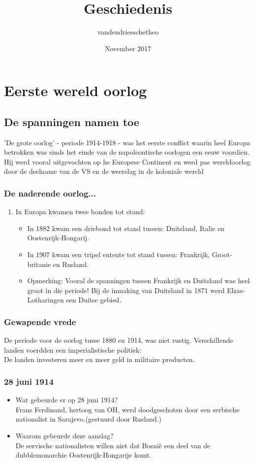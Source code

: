 \documentclass{article}
\title{Geschiedenis}
\author{vandendriesschetheo }
\date{November 2017}
\begin{document}
\maketitle

\section{Eerste wereld oorlog}
\subsection{De spanningen namen toe}
'De grote oorlog' - periode 1914-1918 - was het eerste conflict waarin heel Europa betrokken was sinds het einde van de napoleontische oorlogen een eeuw voordien. Hij werd vooral uitgevochten op he Europese Continent en werd pas wereldoorlog door de deelname van de VS en de weerslag in de koloniale wereld

\subsubsection{De naderende oorlog...}
\begin{enumerate}
    \item In Europa kwamen twee bonden tot stand:
    \begin{itemize}
        \item In 1882 kwam een driebond tot stand tussen: Duitsland, Italie en Oostenrijk-Hongarij.
        \item In 1907 kwam een tripel entente tot stand tussen: Frankrijk, Groot-britanie en Rusland.
        \item Opmerking: Vooral de spanningen tussen Frankrijk en Duitsland was heel groot in die periode! Bij de inmaking van Duitsland in 1871 werd Elzas-Lotharingen een Duitse gebied.
    \end{itemize} 
\end{enumerate}

\subsubsection{Gewapende vrede}
De periode voor de oorlog tusse 1880 en 1914, was niet rustig. Verschillende landen voerdden een imperialistische politiek: \\
De landen investeren meer en meer geld in militaire producten.

\subsubsection{28 juni 1914}
\begin{itemize}
    \item Wat gebeurde er op 28 juni 1914?\\
    Frans Ferdinand, hertoog van OH, werd doodgeschoten door een serbische nationalist in Sarajevo.(gestuurd door Rusland.)
    \item Waarom gebeurde deze aanslag?\\
    De servische nationalisten willen niet dat Bosnië een deel van de dubblemonarchie Oostenrijk-Hongarije komt.
\end{itemize}
\end{document}
